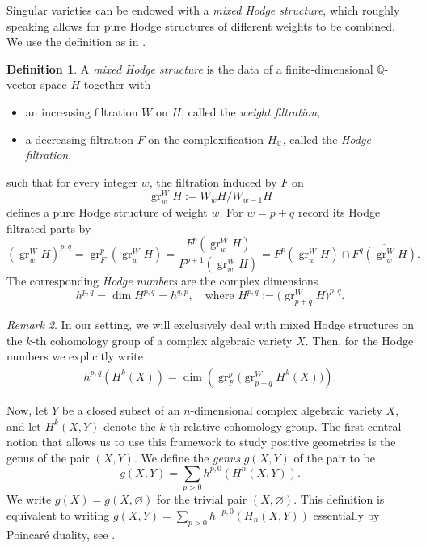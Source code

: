 \documentclass[12pt]{extarticle}
\theoremstyle{definition}
\newtheorem{definition}{Definition}[section]
\theoremstyle{theorem}
\theoremstyle{remark}
\newtheorem{remark}[definition]{Remark}
\numberwithin{equation}{section}
\begin{document}
Singular varieties can be endowed with a \emph{mixed Hodge structure}, which roughly speaking allows for pure Hodge structures of different weights to be combined. We use the definition as in \cite[Definition 1.5]{brown-dupont}.
\begin{definition}
    A \emph{mixed Hodge structure} is the data of a finite-dimensional $\mathbb{Q}$-vector space $H$ together with
    \begin{itemize}
        \item an increasing filtration $W$ on $H$, called the \emph{weight filtration},
        \item a decreasing filtration $F$ on the complexification $H_{\mathbb{C}}$, called the \emph{Hodge filtration},
    \end{itemize}
    such that for every integer $w$, the filtration induced by $F$ on
    \[
    \operatorname{gr}^W_w H := W_w H / W_{w-1} H
    \]
    defines a pure Hodge structure of weight $w$.
    For $w=p+q$ record its Hodge filtrated parts by
    \[
    (\operatorname{gr}^W_w H)^{p,q}=\operatorname{gr}_F^p(\operatorname{gr}^W_w H)=\frac{F^p(\operatorname{gr}^W_w H)}{F^{p+1}(\operatorname{gr}^W_w H)}=F^p(\operatorname{gr}^W_w H)\cap \overline{F^q(\operatorname{gr}^W_w H)}.
    \]
    The corresponding \emph{Hodge numbers} are the complex dimensions
    \[
    h^{p,q} = \dim H^{p,q} = h^{q,p}, 
    \quad \text{where } H^{p,q} := \bigl(\operatorname{gr}^W_{p+q} H\bigr)^{p,q}.
    \]
\end{definition}
\begin{remark}
    In our setting, we will exclusively deal with mixed Hodge structures on the $k$-th cohomology group of a complex algebraic variety $X$. Then, for the Hodge numbers we explicitly write
    \begin{align}\label{eq:Hodge_numbers}
        h^{p,q}(H^k(X)) = \dim\left(\operatorname{gr}_F^p\bigl(\operatorname{gr}^W_{p+q} H^{k}(X)\bigr)\right).
    \end{align}
\end{remark}
Now, let $Y$ be a closed subset of an $n$-dimensional complex algebraic variety $X$, and let $H^k(X,Y)$ denote the $k$-th relative cohomology group.
The first central notion that allows us to use this framework to study positive geometries is the genus of the pair $(X,Y)$.
We define the \emph{genus} $g(X,Y)$ of the pair to be
\[
    g(X,Y) =\sum_{p>0}h^{p,0}(H^n(X,Y)).
\]
We write $g(X)=g(X,\varnothing)$ for the trivial pair $(X,\varnothing)$.
This definition is equivalent to writing $g(X,Y)=\sum_{p>0}h^{-p,0}(H_n(X,Y))$ essentially by Poincaré duality, see \cite[Equation (16)]{brown-dupont}.
\end{document}
